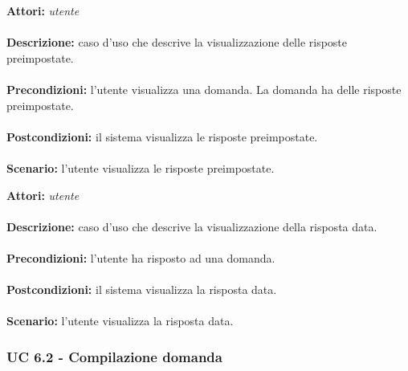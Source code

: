 \documentclass[a4paper,11pt]{article}
\begin{document}

\textbf{Attori:} \textit{utente}
\\ \\
\textbf{Descrizione:} caso d'uso che descrive la visualizzazione delle risposte preimpostate.\\
\\
\textbf{Precondizioni:} l'utente visualizza una domanda. La domanda ha delle risposte preimpostate.\\
\\
\textbf{Postcondizioni:} il sistema visualizza le risposte preimpostate.\\
\\
\textbf{Scenario:} l’utente visualizza le risposte preimpostate.\\



\textbf{Attori:} \textit{utente}
\\ \\
\textbf{Descrizione:} caso d'uso che descrive la visualizzazione della risposta data.\\
\\
\textbf{Precondizioni:} l'utente ha risposto ad una domanda.\\
\\
\textbf{Postcondizioni:} il sistema visualizza la risposta data.\\
\\
\textbf{Scenario:} l’utente visualizza la risposta data.\\


\subsubsection{UC 6.2 - Compilazione domanda}
\end{document}
